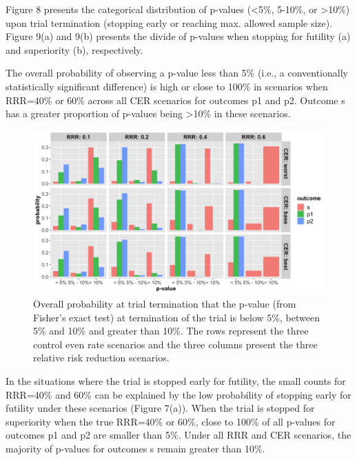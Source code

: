 \documentclass[]{article}
\begin{document}
Figure 8 presents the categorical distribution of p-values
(\textless{}5\%, 5-10\%, or \textgreater{}10\%) upon trial termination
(stopping early or reaching max. allowed sample size). Figure 9(a) and
9(b) presents the divide of p-values when stopping for futility (a) and
superiority (b), respectively.

The overall probability of observing a p-value less than 5\% (i.e., a
conventionally statistically significant difference) is high or close to
100\% in scenarios when RRR=40\% or 60\% across all CER scenarios for
outcomes p1 and p2. Outcome s has a greater proportion of p-values being
\textgreater{}10\% in these scenarios.

\begin{figure}
  \caption{Overall probability at trial termination that the p-value (from Fisher’s exact test) at termination of the
  trial is below 5\%, between 5\% and 10\% and greater than 10\%. The rows represent the three control even rate scenarios
  and the three columns present the three relative risk reduction scenarios.}
  \includegraphics{../p1_plots/batch_size_nb_1000/pvalue_p1.png}
\end{figure}

In the situations where the trial is stopped early for futility, the
small counts for RRR=40\% and 60\% can be explained by the low
probability of stopping early for futility under these scenarios (Figure
7(a)). When the trial is stopped for superiority when the true RRR=40\%
or 60\%, close to 100\% of all p-values for outcomes p1 and p2 are
smaller than 5\%. Under all RRR and CER scenarios, the majority of
p-values for outcomes s remain greater than 10\%.
\end{document}
